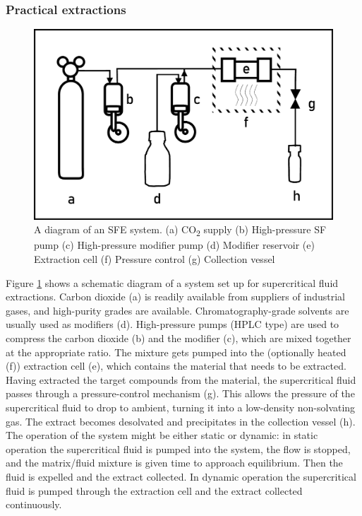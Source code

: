 \subsubsection{Practical extractions}

\begin{figure}
\centering
\includegraphics[width=\textwidth]{Figures/SFE_System}
\decoRule

\caption[SFE system diagram]{A diagram of an SFE system. (a) CO\textsubscript{2} supply (b)
High-pressure SF pump (c) High-pressure modifier pump (d) Modifier reservoir (e)
Extraction cell (f) Pressure control (g) Collection vessel}

\label{fig:sfediagram}
\end{figure}


Figure \ref{fig:sfediagram} shows a schematic diagram of a system set up for
supercritical fluid extractions. Carbon dioxide (a) is readily available from
suppliers of industrial gases, and high-purity grades are available.
Chromatography-grade solvents are usually used as modifiers (d). High-pressure
pumps (HPLC type) are used to compress the carbon dioxide (b) and the modifier
(c), which are mixed together at the appropriate ratio. The mixture gets pumped
into the (optionally heated (f)) extraction cell (e), which contains the
material that needs to be extracted. Having extracted the target compounds from
the material, the supercritical fluid passes through a pressure-control
mechanism (g). This allows the pressure of the supercritical fluid to drop to
ambient, turning it into a low-density non-solvating gas. The extract becomes
desolvated and precipitates in the collection vessel (h). The operation of the
system might be either static or dynamic: in static operation the supercritical
fluid is pumped into the system, the flow is stopped, and the matrix/fluid
mixture is given time to approach equilibrium. Then the fluid is expelled and
the extract collected. In dynamic operation the supercritical fluid is pumped
through the extraction cell and the extract collected continuously.


